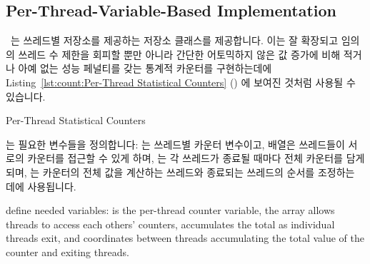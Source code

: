 \fi

\subsection{Per-Thread-Variable-Based Implementation}
\label{sec:count:Per-Thread-Variable-Based Implementation}

\GCC\ 는 쓰레드별 저장소를 제공하는  저장소 클래스를 제공합니다.
이는 잘 확장되고 임의의 쓰레드 수 제한을 회피할 뿐만 아니라 간단한 어토믹하지
않은 값 증가에 비해 적거나 아예 없는 성능 페널티를 갖는 통계적 카운터를
구현하는데에
Listing~\ref{lst:count:Per-Thread Statistical Counters} ()
에 보여진 것처럼 사용될 수 있습니다.

\begin{listing}[tb]

\caption{Per-Thread Statistical Counters}
\label{lst:count:Per-Thread Statistical Counters}
\end{listing}

\begin{fcvref}
 는 필요한 변수들을 정의합니다:
 는 쓰레드별 카운터 변수이고,  배열은 쓰레드들이
서로의 카운터를 접근할 수 있게 하며,  는 각 쓰레드가 종료될
때마다 전체 카운터를 담게 되며,  는 카운터의 전체 값을 계산하는
쓰레드와 종료되는 쓰레드의 순서를 조정하는 데에 사용됩니다.
\end{fcvref}

\iffalse

\begin{fcvref}
 define needed variables:
 is the per-thread counter
variable, the  array allows threads to access each others'
counters,  accumulates the total as individual threads exit,
and  coordinates between threads accumulating the total
value of the counter and exiting threads.
\end{fcvref}

